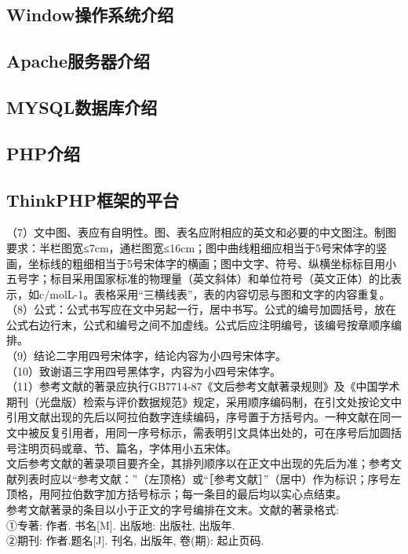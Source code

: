 \documentclass{xmuthesis}
\begin{document}
\begin{flushleft}
\subsection{Window操作系统介绍}
\subsection{Apache服务器介绍}
\subsection{MYSQL数据库介绍}
\subsection{PHP介绍}
\subsection{ThinkPHP框架的平台}
（7）文中图、表应有自明性。图、表名应附相应的英文和必要的中文图注。制图要求：半栏图宽≤7cm，通栏图宽≤16cm；图中曲线粗细应相当于5号宋体字的竖画，坐标线的粗细相当于5号宋体字的横画；图中文字、符号、纵横坐标标目用小五号字；标目采用国家标准的物理量（英文斜体）和单位符号（英文正体）的比表示，如c/molL-1。表格采用“三横线表”，表的内容切忌与图和文字的内容重复。\\
   （8）公式：公式书写应在文中另起一行，居中书写。公式的编号加圆括号，放在公式右边行末，公式和编号之间不加虚线。公式后应注明编号，该编号按章顺序编排。\\
（9）结论二字用四号宋体字，结论内容为小四号宋体字。\\
（10）致谢语三字用四号黑体字，内容为小四号宋体字。\\
   （11）参考文献的著录应执行GB7714-87《文后参考文献著录规则》及《中国学术期刊（光盘版）检索与评价数据规范》规定，采用顺序编码制，在引文处按论文中引用文献出现的先后以阿拉伯数字连续编码，序号置于方括号内。一种文献在同一文中被反复引用者，用同一序号标示，需表明引文具体出处的，可在序号后加圆括号注明页码或章、节、篇名，字体用小五宋体。\\
文后参考文献的著录项目要齐全，其排列顺序以在正文中出现的先后为准；参考文献列表时应以“参考文献：”（左顶格）或“［参考文献］”（居中）作为标识；序号左顶格，用阿拉伯数字加方括号标示；每一条目的最后均以实心点结束。\\
参考文献著录的条目以小于正文的字号编排在文末。文献的著录格式:\\
    ①专著: 作者. 书名[M]. 出版地: 出版社, 出版年.\\
    ②期刊: 作者.题名[J]. 刊名, 出版年, 卷(期): 起止页码.\\

\end{flushleft}
\end{document}
